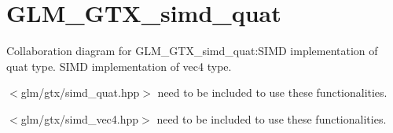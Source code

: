 \hypertarget{group__gtx__simd__vec4}{
\section{GLM\_\-GTX\_\-simd\_\-quat}
\label{group__gtx__simd__vec4}
}


Collaboration diagram for GLM\_\-GTX\_\-simd\_\-quat:SIMD implementation of quat type.  
SIMD implementation of vec4 type.

$<$glm/gtx/simd\_\-quat.hpp$>$ need to be included to use these functionalities.

$<$glm/gtx/simd\_\-vec4.hpp$>$ need to be included to use these functionalities. 
